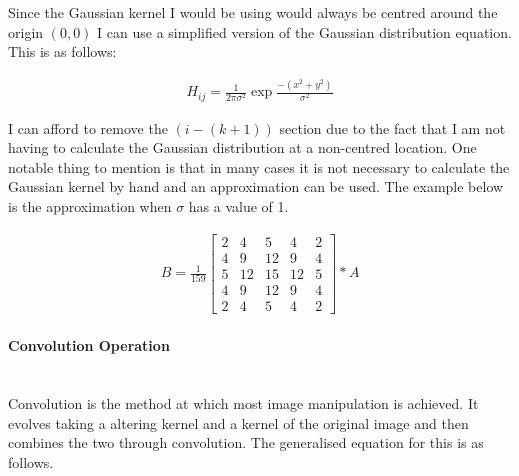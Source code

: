 \begin{FlushLeft}
            \BK
            Since the Gaussian kernel I would be using would always be centred around the origin $(0, 0)$ I can use a simplified version of the Gaussian distribution equation. This is as follows: \\ \bk
            
            \begin{gather*}
                H_{ij} = \frac{1}{2\pi\sigma^2} \exp \frac{-(x^2 + y^2)}{\sigma^2}
            \end{gather*}
            
            \BK
            I can afford to remove the $(i - (k + 1))$ section due to the fact that I am not having to calculate the Gaussian distribution at a non-centred location. One notable thing to mention is that in many cases it is not necessary to calculate the Gaussian kernel by hand and an approximation can be used. The example below is the approximation when $\sigma$ has a value of 1. \\ \bk
            
            \begin{gather*}
                B = \frac{1}{159} \begin{bmatrix} 
                2 & 4 & 5 & 4 & 2\\
                4 & 9 & 12 & 9 & 4\\
                5 & 12 & 15 & 12 & 5\\
                4 & 9 & 12 & 9 & 4\\
                2 & 4 & 5 & 4 & 2
                \end{bmatrix} * A
            \end{gather*}
            \bk
            
            \paragraph{Convolution Operation} \mbox{} \\
            Convolution is the method at which most image manipulation is achieved. It evolves taking a altering kernel and a kernel of the original image and then combines the two through convolution. The generalised equation for this is as follows. \\ \bk
            

\end{FlushLeft}
